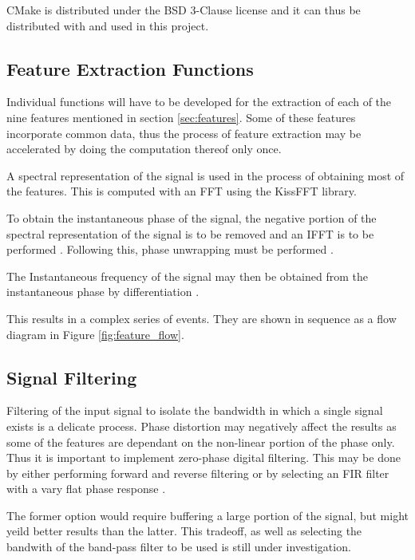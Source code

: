\documentclass[10pt,twocolumn]{witseiepaper}
\begin{document}
			CMake is distributed under the BSD 3-Clause license \cite{cmake_license} and it can thus be distributed with and used in this project.

		\subsection{Feature Extraction Functions}
			Individual functions will have to be developed for the extraction of each of the nine features mentioned in section \ref{sec:features}. Some of these features incorporate common data, thus the process of feature extraction may be accelerated by doing the computation thereof only once.

			A spectral representation of the signal is used in the process of obtaining most of the features. This is computed with an FFT using the KissFFT library. 
			
			To obtain the instantaneous phase of the signal, the negative portion of the spectral representation of the signal is to be removed and an IFFT is to be performed \cite{picinbono1997instantaneous}. Following this, phase unwrapping must be performed \cite{park2009introduction, picinbono1997instantaneous}.

			The Instantaneous frequency of the signal may then be obtained from the instantaneous phase by differentiation \cite{park2009introduction}.

			This results in a complex series of events. They are shown in sequence as a flow diagram in Figure \ref{fig:feature_flow}.

		\subsection{Signal Filtering}
			Filtering of the input signal to isolate the bandwidth in which a single signal exists is a delicate process. 
			Phase distortion may negatively affect the results as some of the features are dependant on the non-linear portion of the phase only. 
			Thus it is important to implement zero-phase digital filtering.
			This may be done by either performing forward and reverse filtering or by selecting an FIR filter with a vary flat phase response \cite{something?}.

			The former option would require buffering a large portion of the signal, but might yeild better results than the latter. This tradeoff, as well as selecting the bandwith of the band-pass filter to be used is still under investigation.
\end{document}
